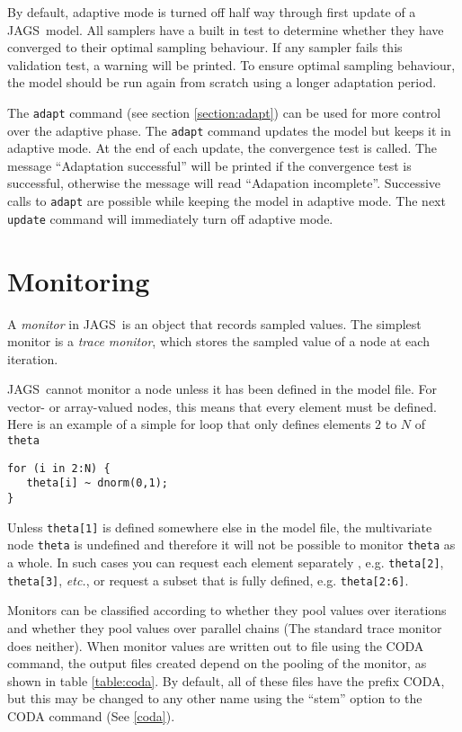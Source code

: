 \documentclass[11pt, a4paper, titlepage]{report}
\newcommand{\JAGS}{\textsf{JAGS}}
\begin{document}
By default, adaptive mode is turned off half way through first update
of a \JAGS\ model. All samplers have a built in test to determine
whether they have converged to their optimal sampling behaviour.  If
any sampler fails this validation test, a warning will be printed. To
ensure optimal sampling behaviour, the model should be run again from
scratch using a longer adaptation period.

The \texttt{adapt} command (see section \ref{section:adapt}) can be
used for more control over the adaptive phase.  The \texttt{adapt}
command updates the model but keeps it in adaptive mode. At the end of
each update, the convergence test is called. The message ``Adaptation
successful'' will be printed if the convergence test is successful,
otherwise the message will read ``Adapation incomplete''.  Successive
calls to \texttt{adapt} are possible while keeping the model in
adaptive mode. The next \texttt{update} command will immediately turn
off adaptive mode.

\section{Monitoring}
\label{section:monitoring}

A {\em monitor} in \JAGS\ is an object that records sampled
values. The simplest monitor is a {\em trace monitor}, which stores
the sampled value of a node at each iteration.

\JAGS\ cannot monitor a node unless it has been defined in the model
file.  For vector- or array-valued nodes, this means that every
element must be defined. Here is an example of a simple for loop that
only defines elements $2$ to $N$ of \verb+theta+

\begin{verbatim}
for (i in 2:N) {
   theta[i] ~ dnorm(0,1);
}
\end{verbatim}

Unless \verb+theta[1]+ is defined somewhere else in the model file,
the multivariate node \verb+theta+ is undefined and therefore it
will not be possible to monitor \verb+theta+ as a whole.  In such
cases you can request each element separately , e.g. \verb+theta[2]+,
\verb+theta[3]+, {\em etc.}, or request a subset that is fully defined,
e.g. \verb+theta[2:6]+.

Monitors can be classified according to whether they pool values over
iterations and whether they pool values over parallel chains (The
standard trace monitor does neither). When monitor values are written
out to file using the CODA command, the output files created depend
on the pooling of the monitor, as shown in table \ref{table:coda}. By
default, all of these files have the prefix CODA, but this may be changed
to any other name using the ``stem'' option to the CODA command
(See \ref{coda}).
\end{document}
